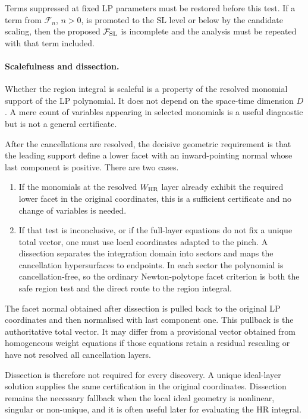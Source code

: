 \documentclass[a4paper,11pt]{article}
\newcommand{\FSL}{\mathcal F_{\rm SL}}
\newcommand{\WHR}{W_{\rm HR}}
\begin{document}
Terms suppressed at fixed LP parameters must be restored before this
test.  If a term from \(\mathcal F_n\), \(n>0\), is promoted to the SL level
or below by the candidate scaling, then the proposed \(\FSL\) is incomplete
and the analysis must be repeated with that term included.

\paragraph{Scalefulness and dissection.}
\label{sec:scaleful}

Whether the region integral is scaleful is a property of the resolved
monomial support of the LP polynomial.  It does not depend on the
space-time dimension \(D\).  A mere count of variables appearing in selected
monomials is a useful diagnostic but is not a general certificate.

After the cancellations are resolved, the decisive geometric requirement is
that the leading support define a lower facet with an inward-pointing normal
whose last component is positive.  There are two cases.

\begin{enumerate}[label=(\arabic*)]
\item If the monomials at the resolved \(\WHR\) layer already exhibit the
      required lower facet in the original coordinates, this is a sufficient
      certificate and no change of variables is needed.
\item If that test is inconclusive, or if the full-layer equations do not
      fix a unique total vector, one must use local coordinates adapted to
      the pinch.  A dissection separates the integration domain into sectors
      and maps the cancellation hypersurfaces to endpoints.  In each sector
      the polynomial is cancellation-free, so the ordinary Newton-polytope
      facet criterion is both the safe region test and the direct route to
      the region integral.
\end{enumerate}

The facet normal obtained after dissection is pulled back to the original
LP coordinates and then normalised with last component one.  This
pullback is the authoritative total vector.  It may differ from a provisional
vector obtained from homogeneous weight equations if those equations retain
a residual rescaling or have not resolved all cancellation layers.

Dissection is therefore not required for every discovery.  A unique
ideal-layer solution supplies the same certification in the original
coordinates.  Dissection remains the necessary fallback when the local
ideal geometry is nonlinear, singular or non-unique, and it is often useful
later for evaluating the HR integral.
\end{document}
